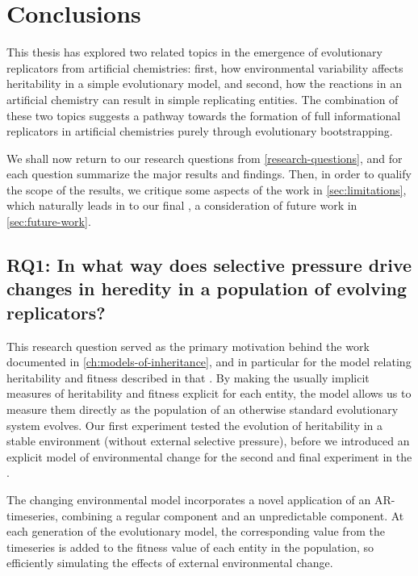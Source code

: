 \chapter{Conclusions}\label{ch:thesis-conclusions}

This thesis has explored two related topics in the emergence of evolutionary replicators from artificial chemistries: first, how environmental variability affects heritability in a simple evolutionary model, and second, how the reactions in an artificial chemistry can result in simple replicating entities. The combination of these two topics suggests a pathway towards the formation of full informational replicators in artificial chemistries purely through evolutionary bootstrapping.

We shall now return to our research questions from \cref{research-questions}, and for each question summarize the major results and findings. Then, in order to qualify the scope of the results, we critique some aspects of the work in \cref{sec:limitations}, which naturally leads in to our final , a consideration of future work in \cref{sec:future-work}.

\section{RQ1: In what way does selective pressure drive changes in heredity in a population of evolving replicators?}

This research question served as the primary motivation behind the work documented in \cref{ch:models-of-inheritance}, and in particular for the model relating heritability and fitness described in that . By making the usually implicit measures of heritability and fitness explicit for each entity, the model allows us to measure them directly as the population of an otherwise standard evolutionary system evolves. Our first experiment tested the evolution of heritability in a stable environment (without external selective pressure), before we introduced an explicit model of environmental change for the second and final experiment in the . 

The changing environmental model incorporates a novel application of an AR-timeseries, combining a regular component and an unpredictable component. At each generation of the evolutionary model, the corresponding value from the timeseries is added to the fitness value of each entity in the population, so efficiently simulating the effects of external environmental change.

